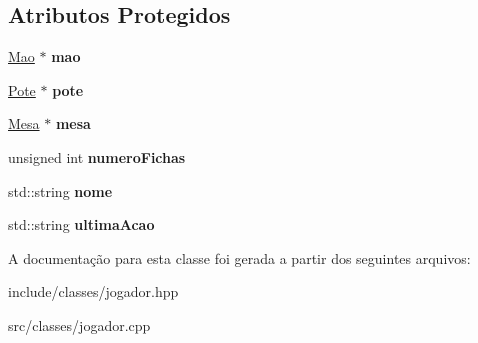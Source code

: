 \subsection*{Atributos Protegidos}
\begin{DoxyCompactItemize}
\item 
\mbox{\label{classpoker_1_1Jogador_a14bd1cd05ba13595c1afd08bd555319d}} 
\hyperlink{classpoker_1_1Mao}{Mao} $\ast$ {\bfseries mao}
\item 
\mbox{\label{classpoker_1_1Jogador_a2d3cbbf2f73aed1ded9167225ac0f7ba}} 
\hyperlink{classpoker_1_1Pote}{Pote} $\ast$ {\bfseries pote}
\item 
\mbox{\label{classpoker_1_1Jogador_a3d7b6d7159f4263bc69cb38954307fc1}} 
\hyperlink{classpoker_1_1Mesa}{Mesa} $\ast$ {\bfseries mesa}
\item 
\mbox{\label{classpoker_1_1Jogador_acdbdc0e234460fd9c2eaae24327a7bc4}} 
unsigned int {\bfseries numero\+Fichas}
\item 
\mbox{\label{classpoker_1_1Jogador_a3554808a42a81df1d779f390800c363d}} 
std\+::string {\bfseries nome}
\item 
\mbox{\label{classpoker_1_1Jogador_a0bb5fecfb53224e471f5c59ab69f23ad}} 
std\+::string {\bfseries ultima\+Acao}
\end{DoxyCompactItemize}


A documentação para esta classe foi gerada a partir dos seguintes arquivos\+:\begin{DoxyCompactItemize}
\item 
include/classes/jogador.\+hpp\item 
src/classes/jogador.\+cpp\end{DoxyCompactItemize}

